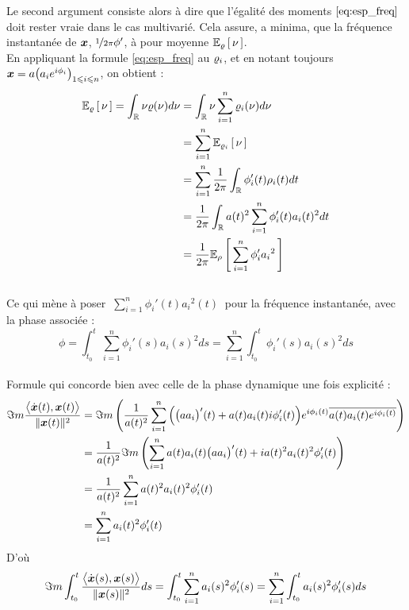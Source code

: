 Le second argument consiste alors à dire que l'égalité des moments $\eqref{eq:esp_freq}$ doit rester vraie dans le cas multivarié. Cela assure, a minima, que la fréquence instantanée de $\x$, $\nicefrac{1}{2\pi}\phi'$, à pour moyenne $\esp[\densis]{\nu}$.
\\

En appliquant la formule \eqref{eq:esp_freq} au $\densis_i$, et en notant toujours $\x = a\big(a_ie^{i\phi_i}\big)_{1\leq i\leq n}$, on obtient :
\begin{align*}
	\esp[\densis]{\nu} = \int_\R \nu\densis(\nu)d\nu &= \int_\R \nu\sum_{i=1}^n \densis_i(\nu) d\nu \\
	&= \sum_{i=1}^n\esp[\densis_i]{\nu} \\
	&= \sum_{i=1}^n\frac{1}{2\pi}\int_\R \phi_i'(t)\densit_i(t)dt \\
	&= \frac{1}{2\pi}\int_\R a(t)^2\sum_{i=1}^n\phi_i'(t)a_i(t)^2 dt 
	\\ &= \frac{1}{2\pi} \esp[\densit]{\sum_{i=1}^n \phi_i'{a_i}^2}
\end{align*}
\\
Ce qui mène à poser $\displaystyle \ \sum_{i=1}^n \phi_i'(t){a_i}^2(t)\ $ pour la fréquence instantanée, avec la phase associée :
\begin{equation}\label{eq:phas_inst_v2}
	\phi = \int_{t_0}^t \sum_{i=1}^n \phi_i'(s){a_i}(s)^2ds 
	= \sum_{i=1}^n \int_{t_0}^t \phi_i'(s){a_i}(s)^2ds 
\end{equation}
\\

Formule qui concorde bien avec celle de la phase dynamique une fois explicité :
\begin{align*}
	\Im m\frac{\big\langle \dot{\x}(t) , \x(t) \big\rangle}{\|\x(t)\|^2} &= \Im m\left( \frac{1}{a(t)^2} \sum_{i=1}^n \Big( \big(aa_i\big)'(t) +a(t)a_i(t)i\phi_i'(t)\Big)e^{i\phi_i(t)}\congu{a(t)a_i(t)e^{i\phi_i(t)}} \right) \\
	&=\frac{1}{a(t)^2}  \Im m\left( \sum_{i=1}^n a(t)a_i(t)\big(aa_i\big)'(t) +ia(t)^2a_i(t)^2\phi_i'(t) \right) \\
	&= \frac{1}{a(t)^2} \sum_{i=1}^n a(t)^2a_i(t)^2 \phi_i'(t) \\
	&= \sum_{i=1}^n a_i(t)^2 \phi_i'(t)
\end{align*}
D'où
\[\Im m\int_{t_0}^t \frac{\big\langle \dot{\x}(s) , \x(s) \big\rangle}{\|\x(s)\|^2} ds = \int_{t_0}^t \sum_{i=1}^n a_i(s)^2 \phi_i'(s) = \sum_{i=1}^n \int_{t_0}^t a_i(s)^2 \phi_i'(s)ds\]
\skipl



